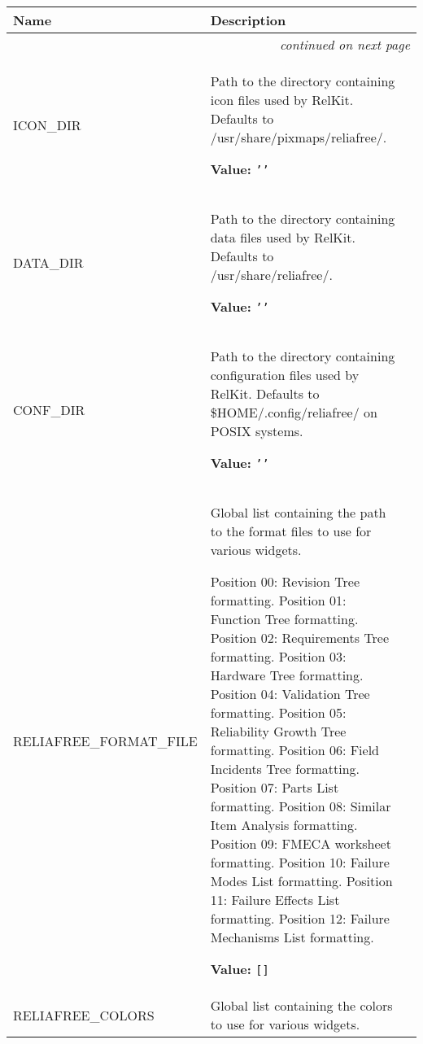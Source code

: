     \vspace{-1cm}
\hspace{\varindent}\begin{longtable}{|p{\varnamewidth}|p{\vardescrwidth}|l}
\cline{1-2}
\cline{1-2} \centering \textbf{Name} & \centering \textbf{Description}& \\
\cline{1-2}
\endhead\cline{1-2}\multicolumn{3}{r}{\small\textit{continued on next page}}\\\endfoot\cline{1-2}
\endlastfoot\raggedright I\-C\-O\-N\-\_\-D\-I\-R\- & \raggedright Path to the directory containing icon files used by RelKit.  
          Defaults to /usr/share/pixmaps/reliafree/.

\textbf{Value:} 
{\tt \texttt{'}\texttt{}\texttt{'}}&\\
\cline{1-2}
\raggedright D\-A\-T\-A\-\_\-D\-I\-R\- & \raggedright Path to the directory containing data files used by RelKit.  
          Defaults to /usr/share/reliafree/.

\textbf{Value:} 
{\tt \texttt{'}\texttt{}\texttt{'}}&\\
\cline{1-2}
\raggedright C\-O\-N\-F\-\_\-D\-I\-R\- & \raggedright Path to the directory containing configuration files used by 
          RelKit. Defaults to \$HOME/.config/reliafree/ on POSIX 
          systems.

\textbf{Value:} 
{\tt \texttt{'}\texttt{}\texttt{'}}&\\
\cline{1-2}
\raggedright R\-E\-L\-I\-A\-F\-R\-E\-E\-\_\-F\-O\-R\-M\-A\-T\-\_\-F\-I\-L\-E\- & \raggedright Global list containing the path to the format files to use for 
          various widgets.

          Position 00: Revision Tree formatting. Position 01: Function Tree
          formatting. Position 02: Requirements Tree formatting. Position 
          03: Hardware Tree formatting. Position 04: Validation Tree 
          formatting. Position 05: Reliability Growth Tree formatting. 
          Position 06: Field Incidents Tree formatting. Position 07: Parts 
          List formatting. Position 08: Similar Item Analysis formatting. 
          Position 09: FMECA worksheet formatting. Position 10: Failure 
          Modes List formatting. Position 11: Failure Effects List 
          formatting. Position 12: Failure Mechanisms List formatting.

\textbf{Value:} 
{\tt \texttt{[}\texttt{]}}&\\
\cline{1-2}
\raggedright R\-E\-L\-I\-A\-F\-R\-E\-E\-\_\-C\-O\-L\-O\-R\-S\- & \raggedright Global list containing the colors to use for various widgets.


\end{longtable}
